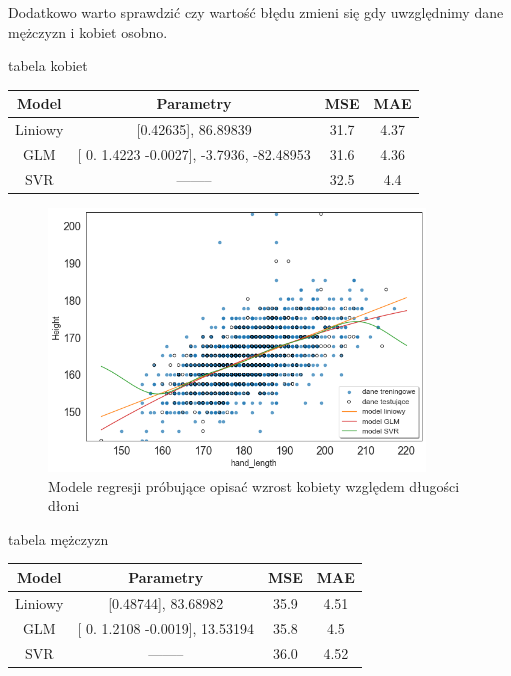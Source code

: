 \documentclass{article}
\begin{document}
\newpage
Dodatkowo warto sprawdzić czy wartość błędu zmieni się gdy uwzględnimy dane mężczyzn i kobiet osobno. 
\begin{center}
tabela kobiet
\end{center}
\begin{center}
\begin{tabular}{ |c|c|c|c| } 
 \hline
 Model & Parametry & MSE & MAE  \\ 
 \hline
 \hline
 Liniowy & [0.42635], 86.89839 & 31.7 & 4.37 \\ 
 \hline
 GLM & [ 0.      1.4223 -0.0027], -3.7936, -82.48953 & 31.6 & 4.36 \\
 \hline
 SVR  & ——– & 32.5 & 4.4   \\
 \hline
\end{tabular}
\end{center}

\begin{figure}[H]
    \centering
    \includegraphics[width=10cm]{modelregresjiwysokosc_women.png}
    \caption{Modele regresji próbujące opisać wzrost kobiety względem długości dłoni}
    \label{fig:my_img}
\end{figure}

\newpage
\begin{center}
tabela mężczyzn
\end{center}
\begin{center}
\begin{tabular}{ |c|c|c|c| } 
 \hline
 Model & Parametry & MSE & MAE  \\ 
 \hline
 \hline
 Liniowy & [0.48744], 83.68982 & 35.9 & 4.51 \\ 
 \hline
 GLM & [ 0.      1.2108 -0.0019], 13.53194 & 35.8 & 4.5 \\
 \hline
 SVR  & ——– & 36.0 & 4.52   \\
 \hline
\end{tabular}
\end{center}
\end{document}
